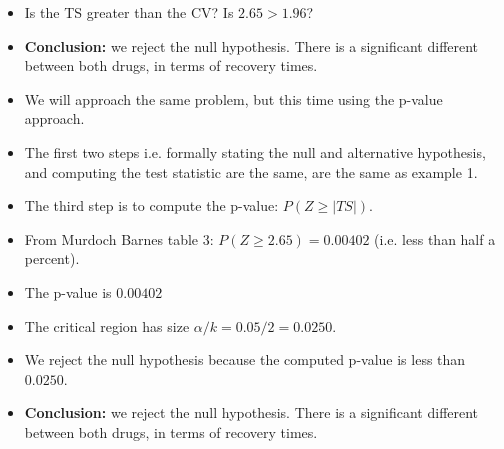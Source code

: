 \documentclass[a4paper,12pt]{article}
\begin{document}
\medskip 
\begin{itemize}

\item Is the TS greater than the CV? Is $2.65 > 1.96$?

\item \textbf{Conclusion:} we reject the null hypothesis. There is a significant different between both drugs, in terms of recovery times.

\end{itemize}
\medskip 

\newpage 
\medskip 
\begin{itemize}
\item We will approach the same problem, but this time using the p-value approach.
\item The first two steps i.e. formally stating the null and alternative hypothesis, and computing the test statistic are the same, are the same as example 1.
\item The third step is to compute the p-value:  $P(Z \geq |TS|)$.
\item From Murdoch Barnes table 3: $P(Z \geq 2.65) = 0.00402$ (i.e. less than half a percent).

\end{itemize}
\medskip 

\medskip 
\begin{itemize}
\item The p-value is  $0.00402$
\item The critical region has size $\alpha/k = 0.05/2 = 0.0250$.
\item We reject the null hypothesis because the computed p-value is less than $0.0250$.
\item \textbf{Conclusion:} we reject the null hypothesis. There is a significant different between both drugs, in terms of recovery times.
\end{itemize}
\end{document}
